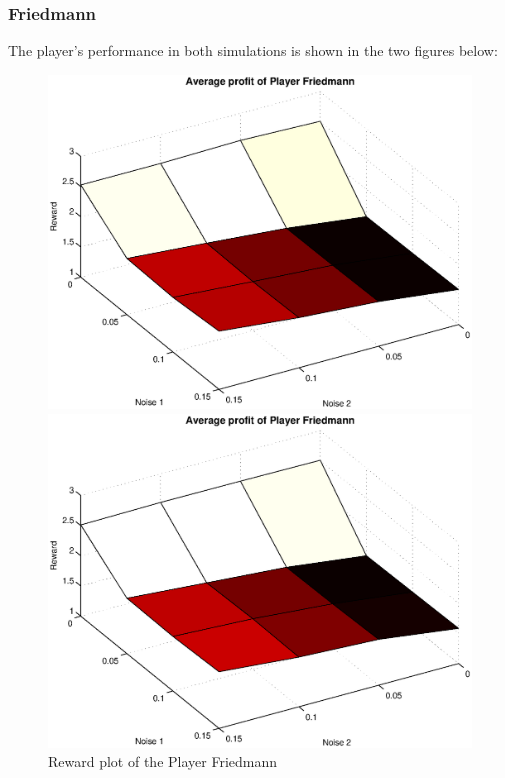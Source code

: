\documentclass[11pt,twoside]{article}
\begin{document}
\subsubsection{Friedmann}
The player's performance in both simulations is shown in the two figures below:
\begin{figure}[h]

\begin{minipage}[hbt]{0.65\textwidth}
	\centering
	\includegraphics[width=\textwidth]{pics/simulation1/Reward_vs_Noise_of_Player_Friedmann}
\end{minipage}
\hfill
\begin{minipage}[hbt]{0.3\textwidth}
	\centering
	\includegraphics[width=\textwidth]{pics/simulation2/Reward_vs_Noise_of_Player_Friedmann}
\end{minipage}
	\caption{Reward plot of the Player Friedmann}
	\label{pic player friedmann}
\end{figure}
\end{document}
